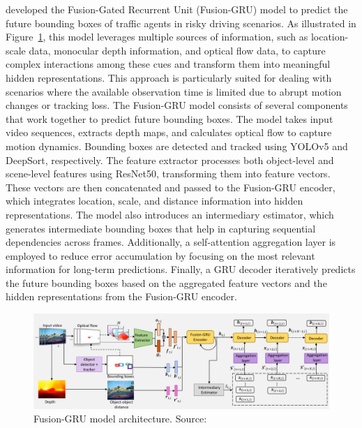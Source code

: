 \documentclass[12pt,oneside]{book} %
\begin{document}
\citet{FusionGRU} developed the Fusion-Gated Recurrent
Unit (Fusion-GRU) model to predict the future bounding boxes of traffic agents
in risky driving scenarios. As illustrated in Figure~\ref{fig:fusion-gru}, this model leverages multiple sources of
information, such as location-scale data, monocular depth information, and
optical flow data, to capture complex interactions among these cues and
transform them into meaningful hidden representations. This approach is
particularly suited for dealing with scenarios where the available observation
time is limited due to abrupt motion changes or tracking loss. 
The Fusion-GRU model consists of several components that work together to
predict future bounding boxes. The model takes input video sequences, extracts
depth maps, and calculates optical flow to capture motion dynamics. Bounding
boxes are detected and tracked using YOLOv5 and DeepSort, respectively. The
feature extractor processes both object-level and scene-level features using
ResNet50, transforming them into feature vectors. These vectors are then
concatenated and passed to the Fusion-GRU encoder, which integrates location,
scale, and distance information into hidden representations. 
The model also introduces an intermediary estimator, which generates
intermediate bounding boxes that help in capturing sequential dependencies
across frames. Additionally, a self-attention aggregation layer is employed to
reduce error accumulation by focusing on the most relevant information for
long-term predictions. Finally, a GRU decoder iteratively predicts the future
bounding boxes based on the aggregated feature vectors and the hidden
representations from the Fusion-GRU encoder.

\begin{figure}[H]
    \centering
    \includegraphics[width=1\textwidth]{figures/FusionGRU.png}
    \caption{Fusion-GRU model architecture. Source:~\citet{FusionGRU}}\label{fig:fusion-gru}
\end{figure}
\end{document}
